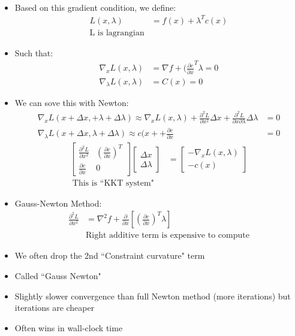 \documentclass[11pt]{article}
\begin{document}
\begin{itemize}
\begin{align*}
    \end{align*}
    \item Based on this gradient condition, we define:
    \begin{align*}
        L(x, \lambda) &= f(x) + \lambda^T c(x)
        \\
        \text{L is lagrangian}
    \end{align*}
    \item Such that:
    \begin{align*}
        \nabla_xL(x,\lambda) &= \nabla f + (\frac{\partial c}{\partial x}^T\lambda = 0
        \\
        \nabla_\lambda L(x,\lambda) &= C(x) = 0
    \end{align*}
    \item We can sove this with Newton:
    \begin{align*}
        \nabla_xL(x+\Delta x, + \lambda + \Delta \lambda) \approx \nabla_xL(x,\lambda) + \frac{\partial^2 L}{\partial x^2}\Delta x + \frac{\partial ^2 L}{\partial x \partial \lambda}\Delta \lambda &= 0
        \\
        \nabla_\lambda L(x+\Delta x, \lambda + \Delta \lambda) \approx c(x+ + \frac{\partial c}{\partial x} &= 0
    \end{align*}
    \begin{align*}
        \begin{bmatrix}
            \frac{\partial^2 L}{\partial x^2} & \left(\frac{\partial c}{\partial x}\right)^T \\
            \frac{\partial c}{\partial x} & 0
        \end{bmatrix}
        \begin{bmatrix}
            \Delta x
            \\
            \Delta \lambda
        \end{bmatrix}
        &= 
        \begin{bmatrix}
            -\nabla_x L(x,\lambda) \\
            -c(x)
        \end{bmatrix}
        \\
        \text{ This is ``KKT system"}
    \end{align*}
    \item Gauss-Newton Method:
    \begin{align*}
        \frac{\partial^2 L}{\partial x^2} &= \nabla^2f + \frac{\partial}{\partial x}\left[\left( \frac{\partial c}{\partial x}\right)^T \lambda  \right]
        \\
        &\text{Right additive term is expensive to compute}
    \end{align*}
    \item We often drop the 2nd ``Constraint curvature" term
    \item Called ``Gauss Newton"
    \item Slightly slower convergence than full Newton method (more iterations) but iterations are cheaper
    \item Often wins in wall-clock time
\end{itemize}
\end{document}
